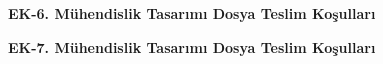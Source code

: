 \newpage    


\textbf{EK-6. Mühendislik Tasarımı Dosya Teslim Koşulları}


\begin{minipage}[t]{\linewidth}
\end{minipage}

\newpage  


\textbf{EK-7. Mühendislik Tasarımı Dosya Teslim Koşulları}


\begin{minipage}[t]{\linewidth}
\end{minipage}
